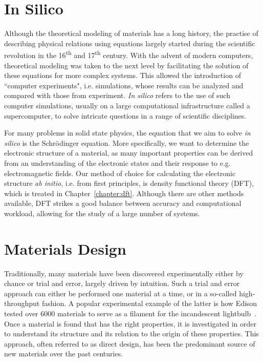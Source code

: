 \begin{refsection}
\newpage
\section{In Silico} \label{intro:sec-in_silico}

Although the theoretical modeling of materials has a long history, the practise 
of describing physical relations using equations largely started during the 
scientific revolution in the 16\textsuperscript{th} and 17\textsuperscript{th} 
century. With the advent of modern computers, theoretical modeling was taken 
to the next level by facilitating the solution of these equations for more 
complex systems. This allowed the introduction of ``computer experiments", i.e. 
simulations, whose results can be analyzed and compared with those from 
experiment. \textit{In silico} refers to the use of such computer simulations, 
usually on a large computational infrastructure called a supercomputer, to 
solve intricate questions in a range of scientific disciplines. 

For many problems in solid state physics, the equation that we aim to solve 
\textit{in silico} is the Schr\"odinger equation. More specifically, we want 
to determine the electronic structure of a material, as many important 
properties can be derived from an understanding of the electronic states and 
their response to e.g. electromagnetic fields. Our method of choice for 
calculating the electronic structure \textit{ab initio}, i.e. from 
first principles, is density functional theory (DFT), which is treated in 
Chapter~\ref{chapter:dft}. Although there are other methods available, DFT 
strikes a good balance between accuracy and computational workload, allowing 
for the study of a large number of systems.

\section{Materials Design} \label{intro:sec-materials_design}

Traditionally, many materials have been discovered experimentally either by 
chance or trial and error, largely driven by intuition. Such a trial and error 
approach can either be performed one material at a time, or in a so-called 
high-throughput fashion. A popular experimental example of the latter is how 
Edison tested over 6000 materials to serve as a filament for the incandescent 
lightbulb~\cite{E.1918}. Once a material is found that has the right properties, 
it is investigated in order to understand its structure and its relation to the 
origin of these properties. This approach, often referred to as direct design, 
has been the predominant source of new materials over the past centuries.


\end{refsection}
